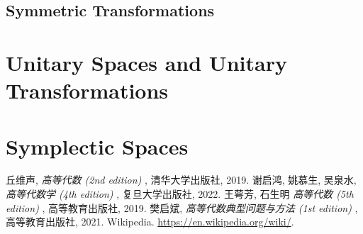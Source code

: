 \documentclass[11pt]{../../TexTemplate/elegantbook} %
\begin{document}
\subsection{Symmetric Transformations}

\section{Unitary Spaces and Unitary Transformations}

\section{Symplectic Spaces}

\begin{thebibliography}{99} 
 丘维声, \emph{ 高等代数 (2nd edition) }, 清华大学出版社, 2019. 
 谢启鸿, 姚慕生, 吴泉水, \emph{ 高等代数学 (4th edition) }, 复旦大学出版社, 2022.
 王萼芳, 石生明 \emph{ 高等代数 (5th edition) }, 高等教育出版社, 2019.
 樊启斌, \emph{ 高等代数典型问题与方法 (1st edition) }, 高等教育出版社, 2021.
 Wikipedia. \url{https://en.wikipedia.org/wiki/}.
\end{thebibliography}
\end{document}
